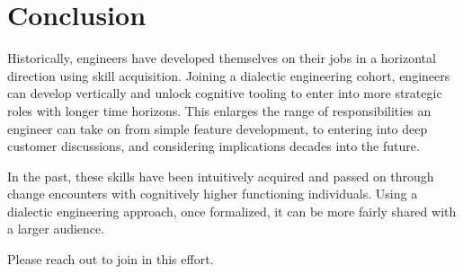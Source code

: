 \section{Conclusion}

Historically, engineers have developed themselves on their jobs in a horizontal direction using skill acquisition.
Joining a dialectic engineering cohort, engineers can develop vertically and unlock cognitive tooling to enter into
more strategic roles with longer time horizons.
This enlarges the range of responsibilities an engineer can take on from simple feature development, to entering into
deep customer discussions, and considering implications decades into the future.

In the past, these skills have been intuitively acquired and passed on through change encounters with cognitively
higher functioning individuals.
Using a dialectic engineering approach, once formalized, it can be more fairly shared with a larger audience.

Please reach out to join in this effort.